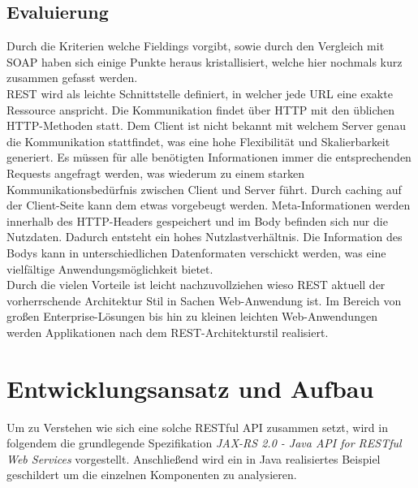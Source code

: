 \documentclass[fleqn,10.5pt,ngerman]{SelfArx}
\begin{document}
\subsection{Evaluierung}
Durch die Kriterien welche Fieldings vorgibt, sowie durch den Vergleich mit SOAP haben sich einige Punkte heraus kristallisiert, welche hier nochmals kurz zusammen gefasst werden. \\ REST wird als leichte Schnittstelle definiert, in welcher jede URL eine exakte Ressource anspricht. Die Kommunikation findet über HTTP mit den üblichen HTTP-Methoden statt. Dem Client ist nicht bekannt mit welchem Server genau die Kommunikation stattfindet, was eine hohe Flexibilität und Skalierbarkeit generiert. Es müssen für alle benötigten Informationen immer die entsprechenden Requests angefragt werden, was wiederum zu einem starken Kommunikationsbedürfnis zwischen Client und Server führt. Durch caching auf der Client-Seite kann dem etwas vorgebeugt werden. Meta-Informationen werden innerhalb des HTTP-Headers gespeichert und im Body befinden sich nur die Nutzdaten. Dadurch entsteht ein hohes Nutzlastverhältnis. Die Information des Bodys kann in unterschiedlichen Datenformaten verschickt werden, was eine vielfältige Anwendungsmöglichkeit bietet. \\ Durch die vielen Vorteile ist leicht nachzuvollziehen wieso REST aktuell der vorherrschende Architektur Stil in Sachen Web-Anwendung ist. Im Bereich von großen Enterprise-Lösungen bis hin zu kleinen leichten Web-Anwendungen werden Applikationen nach dem REST-Architekturstil realisiert. 

\section{Entwicklungsansatz und Aufbau}
Um zu Verstehen wie sich eine solche RESTful API zusammen setzt, wird in folgendem die grundlegende Spezifikation \textit{JAX-RS 2.0 - Java API for RESTful Web Services} vorgestellt. Anschließend wird ein in Java realisiertes Beispiel geschildert um die einzelnen Komponenten zu analysieren. 
\end{document}
